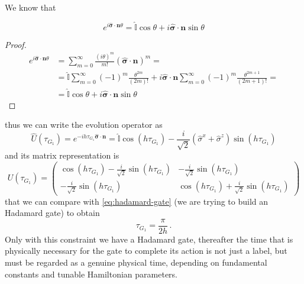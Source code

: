 We know that
\begin{theorem}
\begin{equation*}
e^{i\hat{\boldsymbol{\sigma}} \cdot \mathbf{n}\theta} = \hat{\mathbb{I}}\cos\theta + i\hat{\boldsymbol{\sigma}} \cdot \mathbf{n} \sin\theta
\end{equation*}
\end{theorem}
\begin{proof}
\begin{equation*}
\begin{split}
 e^{i\hat{\boldsymbol{\sigma}} \cdot \mathbf{n}\theta} &=  \sum_{m=0}^\infty \frac{(i\theta)^m}{m!} (\hat{\boldsymbol{\sigma}} \cdot \mathbf{n} )^m = \\
    &= \hat{\mathbb{I}} \sum_{m=0}^\infty (-1)^m \frac{\theta^{2m}}{(2m)!}  + i\hat{\boldsymbol{\sigma}} \cdot \mathbf{n} \sum_{m=0}^\infty (-1)^m \frac{\theta^{2m+1}}{(2m+1)!} = \\
&= \hat{\mathbb{I}}\cos\theta + i\hat{\boldsymbol{\sigma}} \cdot \mathbf{n} \sin\theta
\end{split}
\end{equation*}
\end{proof}
thus we can write the evolution operator as
\begin{equation*}
    \hat{U}(\tau_{G_1}) = e^{-ih\tau_{G_1} \hat{\boldsymbol{\sigma}} \cdot \mathbf{n}} = \hat{\mathbb{I}}\cos(h\tau_{G_1}) - \frac{i}{\sqrt{2}} (\hat{\sigma}^x + \hat{\sigma}^z) \sin(h\tau_{G_1})
\end{equation*}
and its matrix representation is
\begin{equation*}
    U(\tau_{G_1}) = 
    \begin{pmatrix}
    \cos(h\tau_{G_1}) - \frac{i}{\sqrt{2}} \sin(h\tau_{G_1})  & - \frac{i}{\sqrt{2}} \sin(h\tau_{G_1}) \\
    - \frac{i}{\sqrt{2}} \sin(h\tau_{G_1}) & \cos(h\tau_{G_1}) + \frac{i}{\sqrt{2}} \sin(h\tau_{G_1})
    \end{pmatrix}
\end{equation*}
that we can compare with \eqref{eq:hadamard-gate} (we are trying to build an Hadamard gate) to obtain
\begin{equation*}
    \tau_{G_1} = \frac{\pi}{2h}\,.
\end{equation*}
Only with this constraint we have a Hadamard gate, thereafter the time that is physically necessary for the gate to complete its action is not just a
label, but must be regarded as a genuine physical time, depending on fundamental constants and tunable Hamiltonian parameters.
